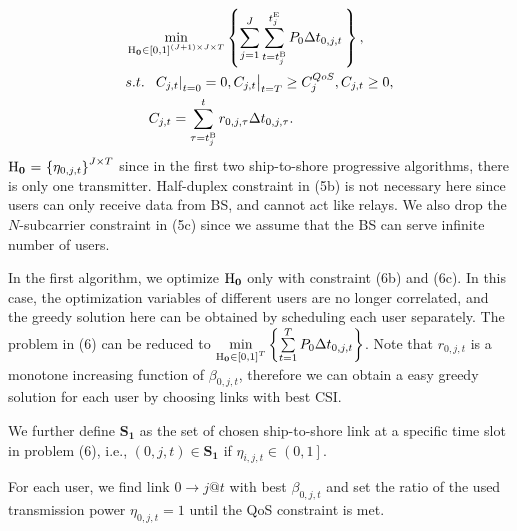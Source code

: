 \documentclass[conference]{IEEEtran}
\begin{document}
\begin{subequations}
\begin{align}
& \mathop {\min }\limits_{{\mathbf{{\rm H}}}_{\mathbf{0}} \in {{\left[ {0,1} \right]}^{\left( {J + 1} \right) \times J \times T}}} \left\{ {\sum\limits_{j = 1}^J {\sum\limits_{t = t_j^{{\rm{B}}}}^{t_j^{{\rm{E}}}} {{P_{0}}\Delta t_{0,j,t} } \,} } \right\} ,\\
& {s.t.} \;\; {\left. {{{\left. {{C_{j,t}}} \right|}_{t = 0}} = 0, {C_{j,t}}} \right|_{t = T}} \ge C_j^{QoS}, {C_{j,t}} \ge 0, \\
& \;\;\;\;\;\; {C_{j,t}} = \sum\limits_{\tau  = t_j^{{\rm{B}}}}^t {{r_{0,j,\tau }}\Delta t_{0,j,\tau} }.
\end{align}
\end{subequations}
${{\mathbf{{\rm H}}}_{\mathbf{0}}}{\text{ = }}{\left\{ {{\eta _{0,j,t}}} \right\}^{J \times T}}$ since in the first two ship-to-shore progressive algorithms, there is only one transmitter. 
Half-duplex constraint in (5b) is not necessary here since users can only receive data from BS, and cannot act like relays. We also drop the $N$-subcarrier constraint in (5c) since we assume that the BS can serve infinite number of users. 

In the first algorithm, we optimize ${{\mathbf{{\rm H}}}_{\mathbf{0}}}$ only with constraint (6b) and (6c). In this case, the optimization variables of different users are no longer correlated, and the greedy solution here can be obtained by scheduling each user separately. The problem in (6) can be reduced to $\mathop {\min }\limits_{{{\mathbf{{\rm H}}}_{\mathbf{0}}} \in {{\left[ {0,1} \right]}^T}} \left\{ {\sum\limits_{t = 1}^T {{P_{0}}\Delta t_{0,j,t} } } \right\}$. Note that ${r_{0,j,t}}$ is a monotone increasing function of ${\beta _{0,j,t}}$, therefore we can obtain a easy greedy solution for each user by choosing links with best CSI. 

We further define ${{\mathbf{S}}_{\mathbf{1}}}$ as the set of chosen ship-to-shore link at a specific time slot in problem (6), i.e., $\left( {0,j,t} \right) \in {\mathbf{S}}_{\mathbf{1}}$ if ${\eta _{i,j,t}} \in \left( {0,1} \right]$. 

For each user, we find link $0 \to j@t$ with best ${\beta _{0,j,t}}$ and set the ratio of the used transmission power ${\eta _{0,j,t} = 1}$ until the QoS constraint is met.
\end{document}
